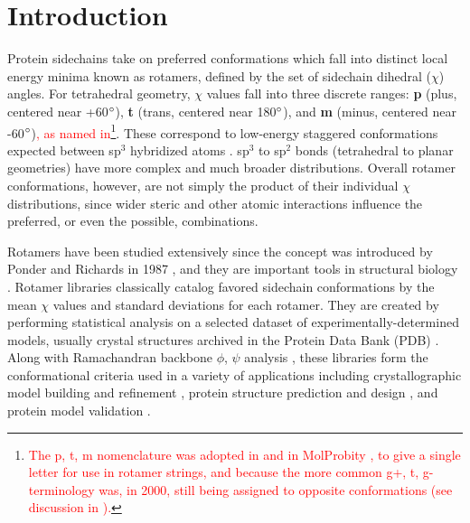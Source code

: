 \section{Introduction}
Protein sidechains take on preferred conformations which fall into distinct local energy minima known as rotamers, defined by the set of sidechain dihedral ($\chi$) angles. For tetrahedral geometry, $\chi$ values fall into three discrete ranges: \textbf{p} (plus, centered near +60$\degree$), \textbf{t} (trans, centered near 180$\degree$), and \textbf{m} (minus, centered near -60$\degree$)\textcolor{red}{, as named in\cite{lovell2000penultimate}\footnote{\textcolor{red}{The p, t, m nomenclature was adopted in \cite{lovell2000penultimate} and in MolProbity \cite{Davis2004}, to give a single letter for use in rotamer strings, and because the more common g+, t, g- terminology was, in 2000, still being assigned to opposite conformations (see discussion in \cite{lovell2000penultimate}).}}}. These correspond to low-energy staggered conformations expected between sp$^{3}$ hybridized atoms \cite{Eyring1932}. sp$^{3}$ to sp$^{2}$ bonds (tetrahedral to planar geometries) have more complex and much broader distributions. Overall rotamer conformations, however, are not simply the product of their individual $\chi$ distributions, since wider steric and other atomic interactions influence the preferred, or even the possible, combinations.

Rotamers have been studied extensively since the concept was introduced by Ponder and Richards in 1987 \cite{Ponder1987}, and they are important tools in structural biology \cite{DunbrackJr2002431}. Rotamer libraries classically catalog favored sidechain conformations by the mean $\chi$ values and standard deviations for each rotamer. They are created by performing statistical analysis on a selected dataset of experimentally-determined models, usually crystal structures archived in the Protein Data Bank (PDB) \cite{Berman2000}. Along with Ramachandran backbone $\phi$, $\psi$ analysis \cite{RAMACHANDRAN1963,JSR_theplot_2013}, these libraries form the conformational criteria used in a variety of applications including crystallographic model building and refinement \textcolor{red}{\cite{Arendall2005, Emsley:ba5144, Adams:2010fk, Winn2011, Joosten2011}}, protein structure prediction and design \cite{Bower1997, Kuhlman21112003, Gainza:2012}, and protein model validation \cite{Laskowski:gl0276, Hooft1996, Chen:2010kx}.

